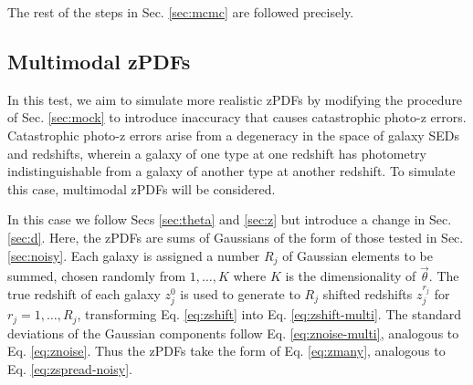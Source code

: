 \documentclass[preprint]{aastex}
\begin{document}
The rest of the steps in Sec. \ref{sec:mcmc} are followed precisely.

%
%
%

\clearpage
\subsection{Multimodal zPDFs}
\label{sec:multi}

In this test, we aim to simulate more realistic zPDFs by modifying the procedure of Sec. \ref{sec:mock} to introduce inaccuracy that causes catastrophic photo-z errors.  Catastrophic photo-z errors arise from a degeneracy in the space of galaxy SEDs and redshifts, wherein a galaxy of one type at one redshift has photometry indistinguishable from a galaxy of another type at another redshift.  To simulate this case, multimodal zPDFs will be considered.

In this case we follow Secs \ref{sec:theta} and \ref{sec:z} but introduce a change in Sec. \ref{sec:d}.  Here, the zPDFs are sums of Gaussians of the form of those tested in Sec. \ref{sec:noisy}.  Each galaxy is assigned a number $R_{j}$ of Gaussian elements to be summed, chosen randomly from $1,\dots,K$ where $K$ is the dimensionality of $\vec{\theta}$.  The true redshift of each galaxy $z_{j}^{0}$ is used to generate to $R_{j}$ shifted redshifts $z^{r_{j}}_{j}$ for $r_{j}=1,\dots,R_{j}$, transforming Eq. \ref{eq:zshift} into Eq. \ref{eq:zshift-multi}.  The standard deviations of the Gaussian components follow Eq. \ref{eq:znoise-multi}, analogous to Eq. \ref{eq:znoise}.  Thus the zPDFs take the form of Eq. \ref{eq:zmany}, analogous to Eq. \ref{eq:zspread-noisy}.  
\end{document}
